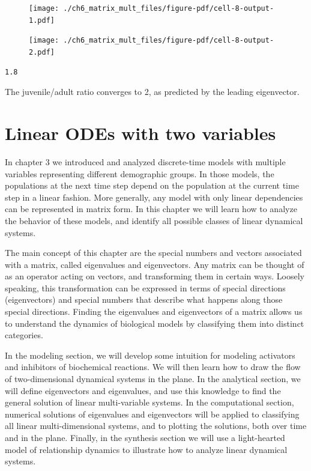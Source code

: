 \documentclass[
  letterpaper,
  DIV=11,
  numbers=noendperiod]{scrreprt}
\begin{document}
\begin{figure}[H]

{\centering \texttt{[image: ./ch6\_matrix\_mult\_files/figure-pdf/cell-8-output-1.pdf]}

}

\end{figure}

\begin{figure}[H]

{\centering \texttt{[image: ./ch6\_matrix\_mult\_files/figure-pdf/cell-8-output-2.pdf]}

}

\end{figure}

\begin{verbatim}
1.8
\end{verbatim}

The juvenile/adult ratio converges to 2, as predicted by the leading
eigenvector.


\hypertarget{linear-odes-with-two-variables}{%
\chapter{Linear ODEs with two
variables}\label{linear-odes-with-two-variables}}

In chapter 3 we introduced and analyzed discrete-time models with
multiple variables representing different demographic groups. In those
models, the populations at the next time step depend on the population
at the current time step in a linear fashion. More generally, any model
with only linear dependencies can be represented in matrix form. In this
chapter we will learn how to analyze the behavior of these models, and
identify all possible classes of linear dynamical systems.

The main concept of this chapter are the special numbers and vectors
associated with a matrix, called eigenvalues and eigenvectors. Any
matrix can be thought of as an operator acting on vectors, and
transforming them in certain ways. Loosely speaking, this transformation
can be expressed in terms of special directions (eigenvectors) and
special numbers that describe what happens along those special
directions. Finding the eigenvalues and eigenvectors of a matrix allows
us to understand the dynamics of biological models by classifying them
into distinct categories.

In the modeling section, we will develop some intuition for modeling
activators and inhibitors of biochemical reactions. We will then learn
how to draw the flow of two-dimensional dynamical systems in the plane.
In the analytical section, we will define eigenvectors and eigenvalues,
and use this knowledge to find the general solution of linear
multi-variable systems. In the computational section, numerical
solutions of eigenvalues and eigenvectors will be applied to classifying
all linear multi-dimensional systems, and to plotting the solutions,
both over time and in the plane. Finally, in the synthesis section we
will use a light-hearted model of relationship dynamics to illustrate
how to analyze linear dynamical systems.
\end{document}
